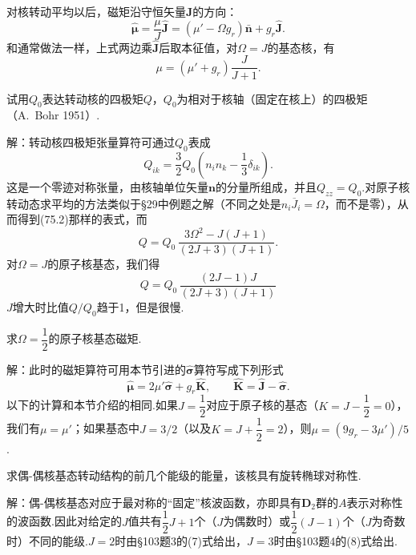 对核转动平均以后，磁矩沿守恒矢量$\boldsymbol{J}$的方向：
\begin{equation*}
  \hat{\boldsymbol{\mu}}=\frac{\mu}{J}\hat{\boldsymbol{J}}
  =\left(\mu'-\Omega g_r\right)\bar{\boldsymbol{n}}+g_r\hat{\boldsymbol{J}}.
\end{equation*}
和通常做法一样，上式两边乘$\hat{\boldsymbol{J}}$后取本征值，对$\Omega=J$的基态核，有
\begin{equation}
  \mu=\left(\mu'+g_r\right)\frac{J}{J+1}.
\end{equation}

\begin{xiti}

\quad 试用$Q_0$表达转动核的四极矩$Q$，$Q_0$为相对于核轴（固定在核上）的四极矩（A.~Bohr 1951\mbox{）.}

解：转动核四极矩张量算符可通过$Q_0$表成
\begin{equation*}
  Q_{ik}=\frac{3}{2}Q_0\left(n_in_k-\frac{1}{3}\delta_{ik}\right).
\end{equation*}
这是一个零迹对称张量，由核轴单位矢量$\boldsymbol{n}$的分量所组成，并且$Q_{zz}=Q_0$.对原子核转动态求平均的方法类似于§29中例题之解（不同之处是$n_i\overline{J}_i=\Omega$，而不是零），从而得到(75.2)那样的表式，而
\begin{equation*}
  Q=Q_0\,\frac{3\Omega^2-J(J+1)}{(2J+3)(J+1)}.
\end{equation*}
对$\Omega=J$的原子核基态，我们得
\begin{equation*}
  Q=Q_0\,\frac{(2J-1)J}{(2J+3)(J+1)}
\end{equation*}
$J$增大时比值$Q/Q_0$趋于1，但是很慢.

\quad 求$\Omega=\dfrac{1}{2}$的原子核基态磁矩.

解：此时的磁矩算符可用本节引进的$\hat{\boldsymbol{\sigma}}$算符写成下列形式
\begin{equation*}
  \hat{\boldsymbol{\mu}}=2\mu'\hat{\boldsymbol{\sigma}}+g_r\hat{\boldsymbol{K}},\qquad
  \hat{\boldsymbol{K}}=\hat{\boldsymbol{J}}-\hat{\boldsymbol{\sigma}}.
\end{equation*}
以下的计算和本节介绍的相同.如果$J=\dfrac{1}{2}$对应于原子核的基态（$K=J-\dfrac{1}{2}=0$），我们有$\mu=\mu'$；如果基态中$J=3/2$（以及$K=J+\dfrac{1}{2}=2$），则$\mu=(9g_r-3\mu')/5$.

\quad 求偶-偶核基态转动结构的前几个能级的能量，该核具有旋转椭球对称性.

解：偶-偶核基态对应于最对称的“固定”核波函数，亦即具有$\boldsymbol{D}_2$群的$A$表示对称性的波函数.因此对给定的$J$值共有$\dfrac{1}{2}J+1$个（$J$为偶数时）或$\dfrac{1}{2}(J-1)$个（$J$为奇数时）不同的能级.$J=2$时由§103题3的(7)式给出，$J=3$时由§103题4的(8)式给出.

\end{xiti}

